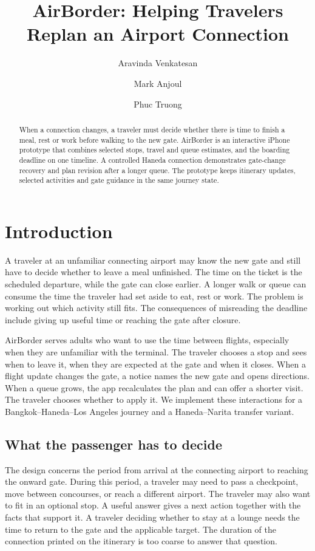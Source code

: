 \documentclass[sigconf,nonacm,balance=false]{acmart}
\title{AirBorder: Helping Travelers Replan an Airport Connection}
\author{Aravinda Venkatesan}
\affiliation{\institution{University of South Florida}\city{Tampa}\state{Florida}\country{USA}}
\author{Mark Anjoul}
\affiliation{\institution{University of South Florida}\city{Tampa}\state{Florida}\country{USA}}
\author{Phuc Truong}
\affiliation{\institution{University of South Florida}\city{Tampa}\state{Florida}\country{USA}}
\begin{document}
\raggedbottom

\begin{abstract}
When a connection changes, a traveler must decide whether there is time to finish a meal, rest or work before walking to the new gate. AirBorder is an interactive iPhone prototype that combines selected stops, travel and queue estimates, and the boarding deadline on one timeline. A controlled Haneda connection demonstrates gate-change recovery and plan revision after a longer queue. The prototype keeps itinerary updates, selected activities and gate guidance in the same journey state.
\end{abstract}
\maketitle

\section{Introduction}
A traveler at an unfamiliar connecting airport may know the new gate and still have to decide whether to leave a meal unfinished. The time on the ticket is the scheduled departure, while the gate can close earlier. A longer walk or queue can consume the time the traveler had set aside to eat, rest or work. The problem is working out which activity still fits. The consequences of misreading the deadline include giving up useful time or reaching the gate after closure.

AirBorder serves adults who want to use the time between flights, especially when they are unfamiliar with the terminal. The traveler chooses a stop and sees when to leave it, when they are expected at the gate and when it closes. When a flight update changes the gate, a notice names the new gate and opens directions. When a queue grows, the app recalculates the plan and can offer a shorter visit. The traveler chooses whether to apply it. We implement these interactions for a Bangkok--Haneda--Los Angeles journey and a Haneda--Narita transfer variant.

\subsection{What the passenger has to decide}
The design concerns the period from arrival at the connecting airport to reaching the onward gate. During this period, a traveler may need to pass a checkpoint, move between concourses, or reach a different airport. The traveler may also want to fit in an optional stop. A useful answer gives a next action together with the facts that support it. A traveler deciding whether to stay at a lounge needs the time to return to the gate and the applicable target. The duration of the connection printed on the itinerary is too coarse to answer that question.
\end{document}
